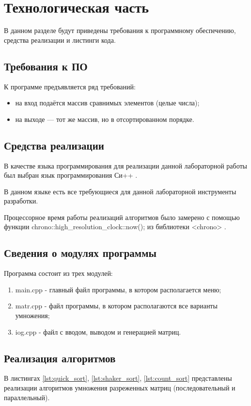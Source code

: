 \chapter{Технологическая часть}

В данном разделе будут приведены требования к программному обеспечению, средства реализации и листинги кода.

\section{Требования к ПО}

К программе предъявляется ряд требований:
\begin{itemize}
	\item на вход подаётся массив сравнимых элементов (целые числа);
	\item на выходе — тот же массив, но в отсортированном порядке.
\end{itemize}

\section{Средства реализации}

В качестве языка программирования для реализации данной лабораторной работы был выбран язык программирования Си++ \cite{pythonlang}. 

В данном языке есть все требующиеся для данной лабораторной инструменты разработки. 

Процессорное время работы реализаций алгоритмов было замерено с помощью функции chrono::high\_resolution\_clock::now(); из библиотеки <chrono> \cite{pythonlangtime}.

\section{Сведения о модулях программы}
Программа состоит из трех модулей:
\begin{enumerate}
	\item main.cpp - главный файл программы, в котором располагается меню;
	\item matr.cpp - файл программы, в котором располагаются все варианты умножения;
	\item iog.cpp - файл с вводом, выводом и генерацией матриц.
\end{enumerate}


\section{Реализация алгоритмов}
В листингах \ref{lst:quick_sort}, \ref{lst:shaker_sort}, \ref{lst:count_sort} представлены реализации алгоритмов умножения разреженных матриц (последовательный и параллельный).

